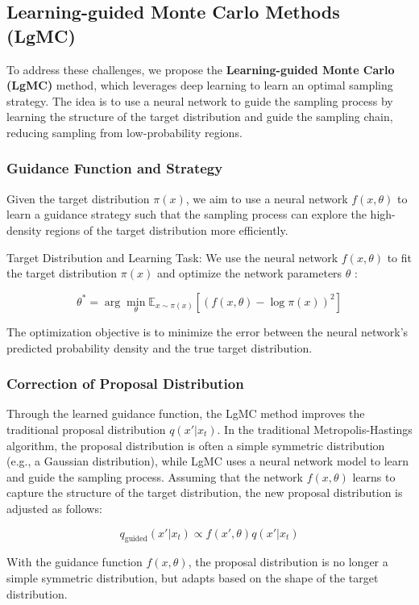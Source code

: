 \documentclass[twocolumn]{article}
\begin{document}
\subsection{Learning-guided Monte Carlo Methods (LgMC)}
To address these challenges, we propose the \textbf{Learning-guided Monte Carlo (LgMC)} method, which leverages deep learning to learn an optimal sampling strategy. The idea is to use a neural network to guide the sampling process by learning the structure of the target distribution and guide the sampling chain, reducing sampling from low-probability regions.

\subsubsection{Guidance Function and Strategy}
Given the target distribution $\pi(x)$, we aim to use a neural network $f(x, \theta)$ to learn a guidance strategy such that the sampling process can explore the high-density regions of the target distribution more efficiently.

Target Distribution and Learning Task: We use the neural network $f(x, \theta)$ to fit the target distribution $\pi(x)$ and optimize the network parameters $\theta$ :

\[
\theta^* = \arg\min_\theta \mathbb{E}_{x \sim \pi(x)} \left[ (f(x, \theta) - \log \pi(x))^2 \right]
\]

The optimization objective is to minimize the error between the neural network's predicted probability density and the true target distribution.

\subsubsection{Correction of Proposal Distribution}
Through the learned guidance function, the LgMC method improves the traditional proposal distribution $q(x'|x_t)$. In the traditional Metropolis-Hastings algorithm, the proposal distribution is often a simple symmetric distribution (e.g., a Gaussian distribution), while LgMC uses a neural network model to learn and guide the sampling process. Assuming that the network $f(x, \theta)$ learns to capture the structure of the target distribution, the new proposal distribution is adjusted as follows:

\[
q_{\text{guided}}(x'|x_t) \propto f(x', \theta) q(x'|x_t)
\]

With the guidance function $f(x, \theta)$, the proposal distribution is no longer a simple symmetric distribution, but adapts based on the shape of the target distribution.
\end{document}
